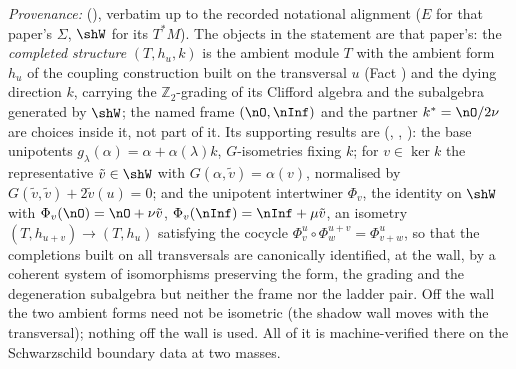 \emph{Provenance:} \cite[Thm.~10.4]{ButlerT4} (), verbatim up to the recorded notational alignment ($E$ for that paper's $\Sigma$, $\shW$ for its $T^*M$). The objects in the statement are that paper's: the \emph{completed structure} $(T, h_u, k)$ is the ambient module $T$ with the ambient form $h_u$ of the coupling construction built on the transversal $u$ (Fact ) and the dying direction $k$, carrying the $\mathbb{Z}_2$-grading of its Clifford algebra and the subalgebra generated by $\shW$; the named frame $(\nO, \nInf)$ and the partner $k^* = \nO/2\nu$ are choices inside it, not part of it. Its supporting results are \cite[Lems 10.1, 10.2, Thm.~10.3]{ButlerT4} (, , ): the base unipotents $g_\lambda(\alpha) = \alpha + \alpha(\lambda)k$, $G$-isometries fixing $k$; for $v \in \ker k$ the representative $\tilde v \in \shW$ with $G(\alpha, \tilde v) = \alpha(v)$, normalised by $G(\tilde v, \tilde v) + 2\tilde v(u) = 0$; and the unipotent intertwiner $\Phi_v$, the identity on $\shW$ with $\Phi_v(\nO) = \nO + \nu\tilde v$, $\Phi_v(\nInf) = \nInf + \mu\tilde v$, an isometry $(T, h_{u+v}) \to (T, h_u)$ satisfying the cocycle $\Phi^u_v \circ \Phi^{u+v}_w = \Phi^u_{v+w}$, so that the completions built on all transversals are canonically identified, at the wall, by a coherent system of isomorphisms preserving the form, the grading and the degeneration subalgebra but neither the frame nor the ladder pair. Off the wall the two ambient forms need not be isometric (the shadow wall moves with the transversal); nothing off the wall is used. All of it is machine-verified there on the Schwarzschild boundary data at two masses.
